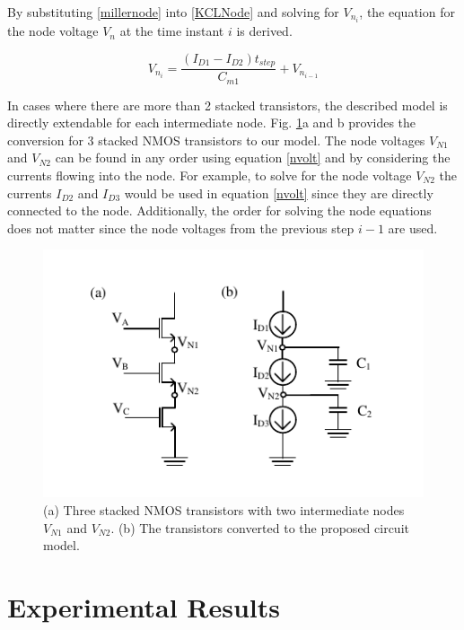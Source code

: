 By substituting \ref{millernode} into \ref{KCLNode} and solving for $V_{n_i}$, the equation for the node voltage $V_n$ at the time instant $i$ is derived.

\begin{equation} \label{nvolt}
V_{n_i} = \frac{(I_{D1} - I_{D2})t_{step}}{C_{m1}} + V_{n_{i-1}}
\end{equation}

In cases where there are more than 2 stacked transistors, the described model is directly extendable for each intermediate node. Fig. \ref{StackT}a and b provides the conversion for 3 stacked NMOS transistors to our model. The node voltages $V_{N1}$ and $V_{N2}$ can be found in any order using equation \ref{nvolt} and by considering the currents flowing into the node. For example, to solve for the node voltage $V_{N2}$ the currents $I_{D2}$ and $I_{D3}$ would be used in equation \ref{nvolt} since they are directly connected to the node. Additionally, the order for solving the node equations does not matter since the node voltages from the previous step $i-1$ are used.

\begin{figure}[!htbp]
	\centering
	\includegraphics[width=0.70\linewidth]{Figures/Stacked}
	\caption{(a) Three stacked NMOS transistors with two intermediate nodes $V_{N1}$ and $V_{N2}$. (b) The transistors converted to the proposed circuit model.}
	\label{StackT}
\end{figure}

\section{Experimental Results}

